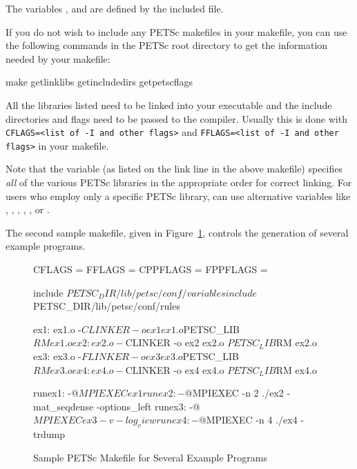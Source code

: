 {{The variables , 
and  are defined by the included  file.

If you do not wish to include any PETSc makefiles in your makefile,
you can use the following commands in the PETSc root directory to get the information
needed by your makefile: 
\begin{bashlisting}
make getlinklibs getincludedirs getpetscflags
\end{bashlisting}
All the libraries listed need to be linked into your executable and the
include directories and flags need to be passed to the compiler.
Usually this is done with \lstinline{CFLAGS=<list of -I and other flags>} and
\lstinline{FFLAGS=<list of -I and other flags>} in your makefile.

 
Note that the variable  (as listed on the link
line in the above makefile) specifies {\em all} of the various PETSc
libraries in the appropriate order for correct linking.  For users who
employ only a specific PETSc library, can use alternative variables
like  , ,
, ,
,  or
.

The second sample makefile, given in Figure~\ref{fig_make2},
controls the generation of several example programs.

\begin{figure}[H]
\begin{makelisting}
   CFLAGS   =
   FFLAGS   =
   CPPFLAGS =
   FPPFLAGS =

   include ${PETSC_DIR}/lib/petsc/conf/variables
   include ${PETSC_DIR}/lib/petsc/conf/rules

   ex1: ex1.o
        -${CLINKER} -o ex1 ex1.o  ${PETSC_LIB}
        ${RM} ex1.o
   ex2: ex2.o
        -${CLINKER} -o ex2 ex2.o  ${PETSC_LIB}
        ${RM} ex2.o
   ex3: ex3.o
        -${FLINKER} -o ex3 ex3.o  ${PETSC_LIB}
        ${RM} ex3.o
   ex4: ex4.o
        -${CLINKER} -o ex4 ex4.o  ${PETSC_LIB}
        ${RM} ex4.o

   runex1:
        -@${MPIEXEC} ex1
   runex2:
        -@${MPIEXEC} -n 2 ./ex2 -mat_seqdense -options_left
   runex3:
        -@${MPIEXEC} ex3 -v -log_view
   runex4:
        -@${MPIEXEC} -n 4 ./ex4 -trdump
\end{makelisting}
\caption{Sample PETSc Makefile for Several Example Programs}
\label{fig_make2}
\end{figure}

}}
